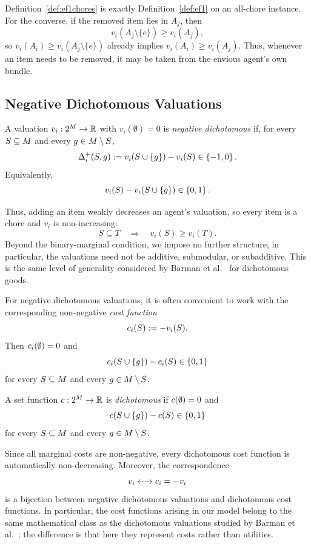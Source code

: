 Definition~\ref{def:ef1chores} is exactly Definition~\ref{def:ef1} on an all-chore instance. For the converse, if the removed item lies in $A_j$, then
\[
    v_i(A_j\setminus\{e\})\geq v_i(A_j),
\]
so $v_i(A_i)\geq v_i(A_j\setminus\{e\})$ already implies $v_i(A_i)\geq v_i(A_j)$. Thus, whenever an item needs to be removed, it may be taken from the envious agent's own bundle.


\subsection{Negative Dichotomous Valuations}
\label{sec:negdich}

\begin{definition} \label{def:negdich}
A valuation $v_i:2^{M}\to\mathbb{R}$ with $v_i(\emptyset)=0$ is \emph{negative dichotomous} if, for every $S\subseteq M$ and every $g\in M\setminus S$,
\[
    \Delta^{+}_{i}(S,g)
    :=v_i(S\cup\left\{g\right\})-v_i(S)
    \in\left\{-1,0\right\}.
\]
Equivalently,
\[
    v_i(S)-v_i(S\cup\left\{g\right\})\in\left\{0,1\right\}.
\]
\end{definition}

Thus, adding an item weakly decreases an agent's valuation, so every item is a chore and $v_i$ is non-increasing:
\[
    S\subseteq T
    \quad\Longrightarrow\quad
    v_i(S)\ge v_i(T).
\]
Beyond the binary-marginal condition, we impose no further structure; in particular, the valuations need not be additive, submodular, or subadditive. This is the same level of generality considered by Barman et al.~\cite{BKNS22} for dichotomous goods.

For negative dichotomous valuations, it is often convenient to work with the corresponding non-negative \emph{cost function}
\[
    c_i(S):=-v_i(S).
\]
Then $c_i(\emptyset)=0$ and
\[
    c_i(S\cup\left\{g\right\})-c_i(S)\in\left\{0,1\right\}
\]
for every $S\subseteq M$ and every $g\in M\setminus S$.

\begin{definition}
\label{def:dichcost}
A set function $c:2^{M}\to\mathbb{R}$ is \emph{dichotomous} if $c(\emptyset)=0$ and
\[
    c(S\cup\left\{g\right\})-c(S)\in\left\{0,1\right\}
\]
for every $S\subseteq M$ and every $g\in M\setminus S$.
\end{definition}

Since all marginal costs are non-negative, every dichotomous cost function is automatically non-decreasing. Moreover, the correspondence
\[
    v_i \longleftrightarrow c_i=-v_i
\]
is a bijection between negative dichotomous valuations and dichotomous cost functions. In particular, the cost functions arising in our model belong to the same mathematical class as the dichotomous valuations studied by Barman et al.~\cite{BKNS22}; the difference is that here they represent costs rather than utilities.

